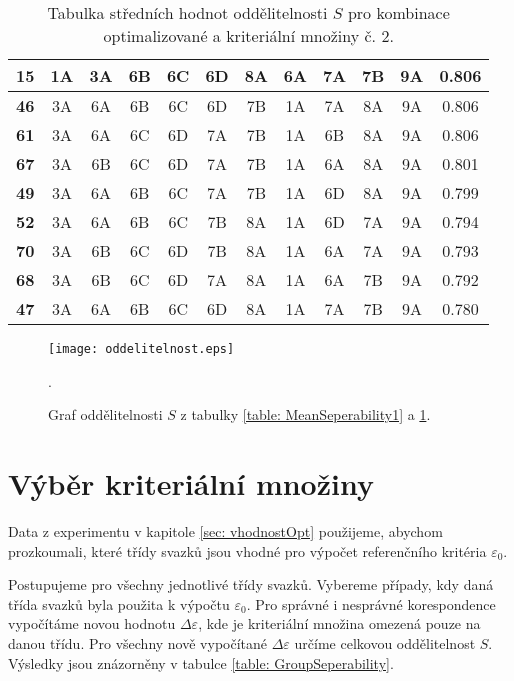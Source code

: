 \begin{table}[h!]
{\begin{tabular}{|c||c|c|c|c|c|c||c|c|c|c||c|}
\hline
\textbf{15} & 1A & 3A & 6B & 6C & 6D & 8A & 6A & 7A & 7B & 9A & 0.806 \\
\hline
\textbf{46} & 3A & 6A & 6B & 6C & 6D & 7B & 1A & 7A & 8A & 9A & 0.806 \\
\hline
\textbf{61} & 3A & 6A & 6C & 6D & 7A & 7B & 1A & 6B & 8A & 9A & 0.806 \\
\hline
\textbf{67} & 3A & 6B & 6C & 6D & 7A & 7B & 1A & 6A & 8A & 9A & 0.801 \\
\hline
\textbf{49} & 3A & 6A & 6B & 6C & 7A & 7B & 1A & 6D & 8A & 9A & 0.799 \\
\hline
\textbf{52} & 3A & 6A & 6B & 6C & 7B & 8A & 1A & 6D & 7A & 9A & 0.794 \\
\hline
\textbf{70} & 3A & 6B & 6C & 6D & 7B & 8A & 1A & 6A & 7A & 9A & 0.793 \\
\hline
\textbf{68} & 3A & 6B & 6C & 6D & 7A & 8A & 1A & 6A & 7B & 9A & 0.792 \\
\hline
\textbf{47} & 3A & 6A & 6B & 6C & 6D & 8A & 1A & 7A & 7B & 9A & 0.780 \\
\hline
\end{tabular}
}
\caption[Střední hodnota $S$ - tabulka č. 2.]{Tabulka středních hodnot oddělitelnosti $S$ pro kombinace optimalizované a kriteriální množiny č. 2.}
\label{table: MeanSeperability2}
\end{table}

\begin{figure}[h!]
\centering
\texttt{[image: oddelitelnost.eps]}
\caption[Graf oddělitelnosti $S$.]{Graf oddělitelnosti $S$ z tabulky \ref{table: MeanSeperability1} a \ref{table: MeanSeperability2}.}.
\label{fig: oddelitelnost}
\end{figure}

\clearpage

\section{Výběr kriteriální množiny}
	Data z experimentu v kapitole \ref{sec: vhodnostOpt} použijeme, abychom prozkoumali, které třídy svazků jsou vhodné pro výpočet referenčního kritéria $\varepsilon_0$.
	
	Postupujeme pro všechny jednotlivé třídy svazků. Vybereme případy, kdy daná třída svazků byla použita k výpočtu $\varepsilon_0$. Pro správné i nesprávné korespondence vypočítáme novou hodnotu $\Delta\varepsilon$, kde je kriteriální množina omezená pouze na danou třídu. Pro všechny nově vypočítané $\Delta\varepsilon$ určíme celkovou oddělitelnost $S$. Výsledky jsou znázorněny v tabulce \ref{table: GroupSeperability}. 
	
